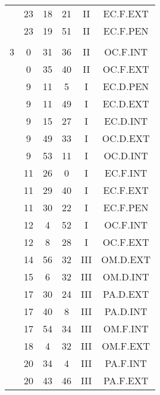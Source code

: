 \documentclass[12pt, a4paper]{article}
\begin{document}
\begin{multicols}{3}
{\begin{tabular}{c c c c c c}
	 	 	 	 & 23 & 18 & 21 & II & EC.F.EXT\\%
	 	 	 	 & 23 & 19 & 51 & II & EC.F.PEN\\%
	 	 	 	 & & & & & \\%
	 	 	 	3 & 0 & 31 & 36 & II & OC.F.INT\\%
	 	 	 	 & 0 & 35 & 40 & II & OC.F.EXT\\%
	 	 	 	 & 9 & 11 & 5 & I & EC.D.PEN\\%
	 	 	 	 & 9 & 11 & 49 & I & EC.D.EXT\\%
	 	 	 	 & 9 & 15 & 27 & I & EC.D.INT\\%
	 	 	 	 & 9 & 49 & 33 & I & OC.D.EXT\\%
	 	 	 	 & 9 & 53 & 11 & I & OC.D.INT\\%
	 	 	 	 & 11 & 26 & 0 & I & EC.F.INT\\%
	 	 	 	 & 11 & 29 & 40 & I & EC.F.EXT\\%
	 	 	 	 & 11 & 30 & 22 & I & EC.F.PEN\\%
	 	 	 	 & 12 & 4 & 52 & I & OC.F.INT\\%
	 	 	 	 & 12 & 8 & 28 & I & OC.F.EXT\\%
	 	 	 	 & 14 & 56 & 32 & III & OM.D.EXT\\%
	 	 	 	 & 15 & 6 & 32 & III & OM.D.INT\\%
	 	 	 	 & 17 & 30 & 24 & III & PA.D.EXT\\%
	 	 	 	 & 17 & 40 & 8 & III & PA.D.INT\\%
	 	 	 	 & 17 & 54 & 34 & III & OM.F.INT\\%
	 	 	 	 & 18 & 4 & 32 & III & OM.F.EXT\\%
	 	 	 	 & 20 & 34 & 4 & III & PA.F.INT\\%
	 	 	 	 & 20 & 43 & 46 & III & PA.F.EXT\\%

\end{tabular}}
\end{multicols}
\end{document}
